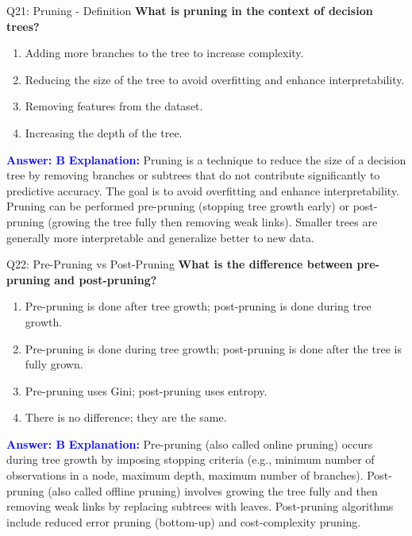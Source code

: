 \documentclass[8pt]{beamer}
\begin{document}
	\begin{frame}{Q21: Pruning - Definition}
		\fontsize{6.5}{7.5}\selectfont
		\textbf{What is pruning in the context of decision trees?}
		\begin{enumerate}
			\item Adding more branches to the tree to increase complexity.
			\item Reducing the size of the tree to avoid overfitting and enhance interpretability.
			\item Removing features from the dataset.
			\item Increasing the depth of the tree.
		\end{enumerate}
		\vspace{0.1cm}
		\textcolor{blue}{\textbf{Answer: B}}
		\vspace{0.1cm}
		\textcolor{blue}{\textbf{Explanation:}} Pruning is a technique to reduce the size of a decision tree by removing branches or subtrees that do not contribute significantly to predictive accuracy. The goal is to avoid overfitting and enhance interpretability. Pruning can be performed pre-pruning (stopping tree growth early) or post-pruning (growing the tree fully then removing weak links). Smaller trees are generally more interpretable and generalize better to new data.
	\end{frame}
	
	\begin{frame}{Q22: Pre-Pruning vs Post-Pruning}
		\fontsize{6.5}{7.5}\selectfont
		\textbf{What is the difference between pre-pruning and post-pruning?}
		\begin{enumerate}
			\item Pre-pruning is done after tree growth; post-pruning is done during tree growth.
			\item Pre-pruning is done during tree growth; post-pruning is done after the tree is fully grown.
			\item Pre-pruning uses Gini; post-pruning uses entropy.
			\item There is no difference; they are the same.
		\end{enumerate}
		\vspace{0.1cm}
		\textcolor{blue}{\textbf{Answer: B}}
		\vspace{0.1cm}
		\textcolor{blue}{\textbf{Explanation:}} Pre-pruning (also called online pruning) occurs during tree growth by imposing stopping criteria (e.g., minimum number of observations in a node, maximum depth, maximum number of branches). Post-pruning (also called offline pruning) involves growing the tree fully and then removing weak links by replacing subtrees with leaves. Post-pruning algorithms include reduced error pruning (bottom-up) and cost-complexity pruning.
	\end{frame}
	
\end{document}
